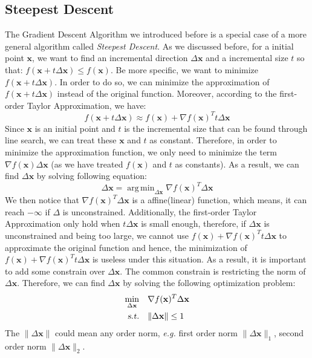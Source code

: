 \documentclass[10pt,a4paper]{article}
\DeclareMathOperator*{\argmin}{arg\,min}
\begin{document}
\subsection{Steepest Descent}
The Gradient Descent Algorithm we introduced before is a special case of a more general algorithm called \textit{Steepest Descent}. As we discussed before, for a initial point $\mathbf{x}$, we want to find an incremental direction $\Delta \mathbf{x}$ and a incremental size $t$ so that: $f(\mathbf{x} + t \Delta \mathbf{x}) \leq f(\mathbf{x})$. Be more specific, we want to minimize $f(\mathbf{x} + t \Delta \mathbf{x})$. In order to do so, we can minimize the approximation of $f(\mathbf{x} + t \Delta \mathbf{x})$ instead of the original function. Moreover, according to the first-order Taylor Approximation, we have:
\begin{equation*}
	f(\mathbf{x} + t \Delta \mathbf{x}) \approx f(\mathbf{x}) + \nabla f(\mathbf{x})^{T} t \Delta \mathbf{x}
\end{equation*}
Since $\mathbf{x}$ is an initial point and $t$ is the incremental size that can be found through line search, we can treat these $\mathbf{x}$ and $t$ as constant. Therefore, in order to minimize the approximation function, we only need to minimize the term $\nabla f(\mathbf{x}) \Delta \mathbf{x}$ (as we have treated $f(\mathbf{x})$ and $t$ as constants). As a result, we can find $\Delta \mathbf{x}$ by solving following equation:
\begin{equation*}
	\Delta \mathbf{x} = \argmin_{\Delta \mathbf{x}} \nabla f(\mathbf{x})^{T} \Delta \mathbf{x}
\end{equation*}
We then notice that $\nabla f(\mathbf{x})^{T} \Delta \mathbf{x}$ is a affine(linear) function, which means, it can reach $-\infty$ if $\Delta$ is unconstrained. Additionally, the first-order Taylor Approximation only hold when $t \Delta \mathbf{x}$ is small enough, therefore, if $\Delta \mathbf{x}$ is unconstrained and being too large, we cannot use $f(\mathbf{x}) + \nabla f(\mathbf{x})^{T} t \Delta \mathbf{x}$ to approximate the original function and hence, the minimization of $f(\mathbf{x}) + \nabla f(\mathbf{x})^{T} t \Delta \mathbf{x}$ is useless under this situation. As a result, it is important to add some constrain over $\Delta \mathbf{x}$. The common constrain is restricting the norm of $\Delta \mathbf{x}$. Therefore, we can find $\Delta \mathbf{x}$ by solving the following optimization problem:
\begin{equation*}
	\begin{aligned}
		\displaystyle\min_{\Delta \mathbf{x}} \quad & \nabla f(\mathbf{x})^{T} \Delta \mathbf{x} \\
		\textsl{s.t.} \quad & \| \Delta \mathbf{x} \| \leq 1
	\end{aligned}
\end{equation*}
The $\| \Delta \mathbf{x} \|$ could mean any order norm, \textsl{e.g.} first order norm $\| \Delta \mathbf{x} \|_{1}$, second order norm $\| \Delta \mathbf{x} \|_2$.
\end{document}
